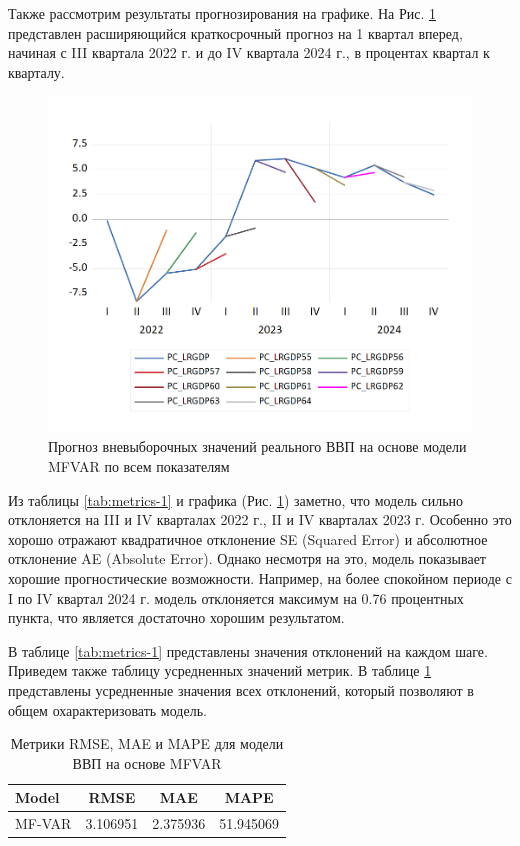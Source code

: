 \documentclass[a4paper, 14pt]{extreport}
\numberwithin{equation}{section}
\numberwithin{equation}{section}
\begin{document}
	Также рассмотрим результаты прогнозирования на графике. На Рис. \ref{fig:image43} представлен расширяющийся краткосрочный прогноз на 1 квартал вперед, начиная с III квартала 2022 г. и до IV квартала 2024 г., в процентах квартал к кварталу. 
	
	\begin{figure}[h!]
		\centering
		\includegraphics[scale=0.7]{images/image43}
		\caption{Прогноз вневыборочных значений реального ВВП на основе модели MFVAR по всем показателям}
		\label{fig:image43}
	\end{figure}
	
	Из таблицы \ref{tab:metrics-1} и графика (Рис. \ref{fig:image43}) заметно, что модель сильно отклоняется на III и IV кварталах 2022 г., II и IV кварталах 2023 г. Особенно это хорошо отражают квадратичное отклонение SE (Squared Error) и абсолютное отклонение AE (Absolute Error).
	Однако несмотря на это, модель показывает хорошие  прогностические возможности. Например, на более спокойном периоде с I по IV квартал 2024 г. модель отклоняется максимум на 0.76 процентных пункта, что является достаточно хорошим результатом.
	
	В таблице \ref{tab:metrics-1} представлены значения отклонений на каждом шаге. Приведем также таблицу усредненных значений метрик. В таблице \ref{tab:model_metrics} представлены усредненные значения всех отклонений, который позволяют в общем охарактеризовать модель.
	
	\begin{table}[h!]
		\centering
		\caption{Метрики RMSE, MAE и MAPE для модели ВВП на основе MFVAR}
		\begin{tabular}{lccc}
			\toprule
			\textbf{Model} & \textbf{RMSE} & \textbf{MAE} & \textbf{MAPE} \\ 
			\midrule
			MF-VAR & 3.106951 & 2.375936 & 51.945069 \\ 
			\bottomrule
		\end{tabular}
		\label{tab:model_metrics}
	\end{table}
	
\end{document}
